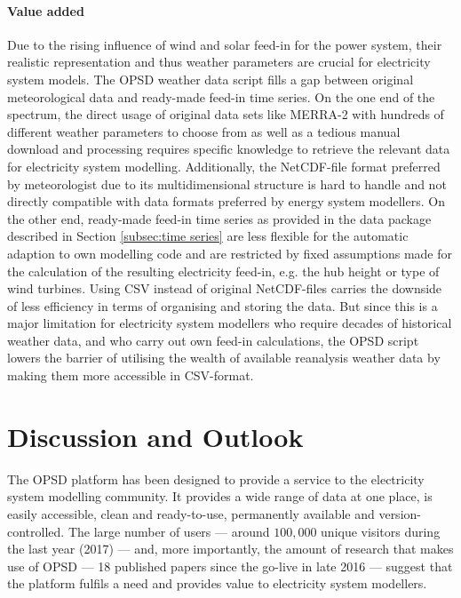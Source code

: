 \documentclass[article,sort&compress]{elsarticle}
\begin{document}
\paragraph{Value added}
Due to the rising influence of wind and solar feed-in for the power system, their realistic representation and thus weather parameters are crucial for electricity system models. The OPSD weather data script fills a gap between original meteorological data and ready-made feed-in time series. On the one end of the spectrum, the direct usage of original data sets like MERRA-2 with hundreds of different weather parameters to choose from as well as a tedious manual download and processing requires specific knowledge to retrieve the relevant data for electricity system modelling. Additionally, the NetCDF-file format preferred by meteorologist due to its multidimensional structure is hard to handle and not directly compatible with data formats preferred by energy system modellers. On the other end, ready-made feed-in time series as provided in the data package described in Section \ref{subsec:time series} are less flexible for the automatic adaption to own modelling code and are restricted by fixed assumptions made for the calculation of the resulting electricity feed-in, e.g. the hub height or type of wind turbines. Using CSV instead of original NetCDF-files carries the downside of less efficiency in terms of organising and storing the data. But since this is a major limitation for electricity system modellers who require decades of historical weather data, and who carry out own feed-in calculations, the OPSD script lowers the barrier of utilising the wealth of available reanalysis weather data by making them more accessible in CSV-format.
        
\section{Discussion and Outlook}
\label{sec:discussion}
The OPSD platform has been designed to provide a service to the electricity system modelling community. It provides a wide range of data at one place, is easily accessible, clean and ready-to-use, permanently available and version-controlled. The large number of users --- around $100,000$ unique visitors during the last year (2017) --- and, more importantly, the amount of research that makes use of OPSD --- 18 published papers \cite{Kendziorski2017,Klein2017,Amme2018,Mueller2017,Mueller2018,Fusco2017,Tafarte2017,ElAmary2018,Gonzales2018,Yaslan2017,Zaidi2018,Gotzens2018,Schill2017,Schill2017b,Zerrahn2018,Robinius2018,Nacken2017,Olauson2018} since the go-live in late 2016 --- suggest that the platform fulfils a need and provides value to electricity system modellers. 
\end{document}
